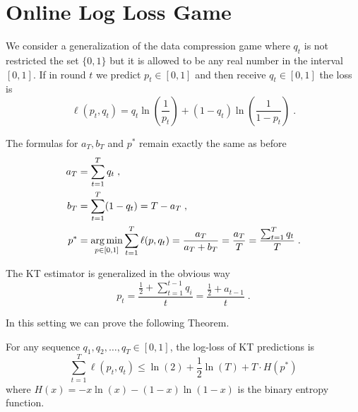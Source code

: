 \section{Online Log Loss Game}
\label{section:log-loss}

We consider a generalization of the data compression game where $q_t$ is not
restricted the set $\{0,1\}$ but it is allowed to be any real number in the
interval $[0,1]$. If in round $t$ we predict $p_t \in [0,1]$ and then receive
$q_t \in [0,1]$ the loss is
$$
\ell(p_t, q_t) = q_t \ln\left( \frac{1}{p_t}\right) + (1-q_t) \ln  \left( \frac{1}{1 - p_t} \right) \; .
$$

The formulas for $a_T, b_T$ and $p^*$ remain exactly the same as before
\begin{align*}
a_T & = \sum_{t=1}^T q_t \; , \\
b_T & = \sum_{t=1}^T (1 - q_t) = T - a_T \; , \\
p^* & =  \operatorname*{arg\,min}_{p \in [0,1]} \sum_{t=1}^T \ell(p, q_t) = \frac{a_T}{a_T + b_T} = \frac{a_T}{T} = \frac{\sum_{t=1}^T q_t}{T} \; .
\end{align*}

The KT estimator is generalized in the obvious way
$$
p_t = \frac{\frac{1}{2} + \sum_{t=1}^{t-1} q_i}{t} = \frac{\frac{1}{2} + a_{t-1}}{t} \; .
$$


In this setting we can prove the following Theorem.
\begin{theorem}
\label{theo:logloss}
For any sequence $q_1, q_2, \dots, q_T \in [0,1]$, the log-loss of KT
predictions is
$$
\sum_{t=1}^T \ell(p_t, q_t) \leq \ln(2) + \frac{1}{2} \ln(T) + T \cdot H(p^*)
$$
where $H(x) = - x \ln(x) - (1-x) \ln (1-x)$ is the binary entropy function.
\end{theorem}
